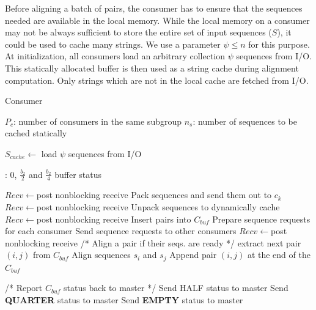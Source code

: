 \documentclass[10pt,journal,letterpaper,compsoc]{IEEEtran}
\begin{document}
Before aligning a batch of pairs, the consumer has to ensure that the sequences needed are available in the local memory. While the local memory on a consumer may not be always sufficient to store the entire set of input sequences ($S$), it could be used to cache many strings. We use a parameter $\psi \leq n$ for this purpose. At initialization, all consumers load an arbitrary collection $\psi$ sequences from I/O. This statically allocated buffer is then used as a string cache during alignment computation. Only strings which are not in the local cache are fetched from I/O.\\


\begin{algorithm}
\caption{Consumer}
\label{cs}
\begin{algorithmic}[1]
    \STATE $P_{c}$: number of consumers in the same subgroup
    \STATE $n_{s}$: number of sequences to be cached statically

    \STATE $S_{cache}\leftarrow$ load $\psi$ sequences from I/O
    
    : $0$, $\frac{b_2}{2}$ and $\frac{b_2}{4}$ buffer status
      
    \STATE $Recv\leftarrow$post nonblocking receive
    \WHILE {\TRUE}
			\STATE Pack sequences and send them out to $c_{k}$
			\STATE $Recv\leftarrow$post nonblocking receive
			\STATE Unpack sequences to dynamically cache
			\STATE $Recv\leftarrow$post nonblocking receive
		        \STATE Insert pairs into $C_{buf}$
			\STATE Prepare sequence requests for each consumer
			\STATE Send sequence requests to other consumers
			\STATE $Recv\leftarrow$post nonblocking receive
	        \ENDIF
	    \ELSE
			\STATE /* Align a pair if their seqs. are ready */
	    		\STATE extract next pair $(i, j)$ from $C_{buf}$
				\STATE Align sequences $s_{i}$ and $s_{j}$
			\ELSE
				\STATE Append pair $(i, j)$ at the end of the $C_{buf}$
			\ENDIF
			
			\STATE /* Report $C_{buf}$ status back to master */
				\STATE Send HALF status to master
				\STATE Send {\bf QUARTER} status to master
				\STATE Send {\bf EMPTY} status to master
			\ENDIF
		\ENDIF
            \ENDIF
    \ENDWHILE
\end{algorithmic}
\end{algorithm}
\end{document}
